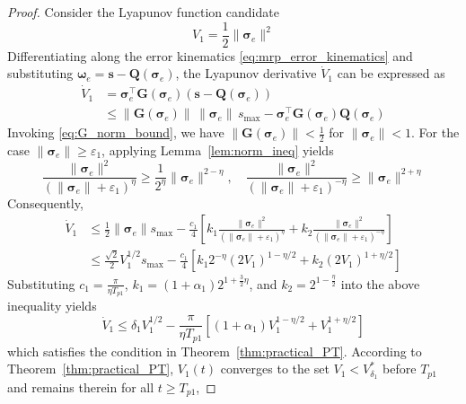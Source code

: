 \documentclass[journal]{new-aiaa}
\begin{document}
\begin{proof}
Consider the Lyapunov function candidate
\begin{equation}
V_1 = \frac{1}{2}\|\boldsymbol{\sigma}_e\|^2
\end{equation}
Differentiating along the error kinematics \eqref{eq:mrp_error_kinematics} and 
substituting $\boldsymbol{\omega}_e = \boldsymbol{s} - \boldsymbol{Q}(\boldsymbol{\sigma}_e)$, 
the Lyapunov derivative $\dot{V}_1$ can be expressed as
\begin{align}
\dot{V}_1 
&= \boldsymbol{\sigma}_e^\top \boldsymbol{G}(\boldsymbol{\sigma}_e)(\boldsymbol{s} - \boldsymbol{Q}(\boldsymbol{\sigma}_e)) \nonumber \\
&\le \|\boldsymbol{G}(\boldsymbol{\sigma}_e)\|\,\|\boldsymbol{\sigma}_e\|\,s_{\max}
- \boldsymbol{\sigma}_e^\top \boldsymbol{G}(\boldsymbol{\sigma}_e) \boldsymbol{Q}(\boldsymbol{\sigma}_e)
\end{align}
Invoking \eqref{eq:G_norm_bound}, we have $\|\boldsymbol{G}(\boldsymbol{\sigma}_e)\| < \tfrac{1}{2}$ for $\|\boldsymbol{\sigma}_e\| < 1$. 
For the case $\|\boldsymbol{\sigma}_e\| \ge \varepsilon_1$, applying Lemma~\ref{lem:norm_ineq} yields
\[
\frac{\|\boldsymbol{\sigma}_e\|^2}{(\|\boldsymbol{\sigma}_e\| + \varepsilon_1)^\eta} \ge \frac{1}{2^\eta} \|\boldsymbol{\sigma}_e\|^{2 - \eta},
\quad
\frac{\|\boldsymbol{\sigma}_e\|^2}{(\|\boldsymbol{\sigma}_e\| + \varepsilon_1)^{-\eta}} \ge \|\boldsymbol{\sigma}_e\|^{2 + \eta}
\]
Consequently,
\begin{align}
\dot{V}_1 
&\le \frac{1}{2} \|\boldsymbol{\sigma}_e\| s_{\max}
- \frac{c_1}{4} \left[
k_1 \frac{\|\boldsymbol{\sigma}_e\|^2}{(\|\boldsymbol{\sigma}_e\| + \varepsilon_1)^\eta}
+ k_2 \frac{\|\boldsymbol{\sigma}_e\|^2}{(\|\boldsymbol{\sigma}_e\| + \varepsilon_1)^{-\eta}}
\right] \nonumber \\
&\le \frac{\sqrt{2}}{2} V_1^{1/2} s_{\max}
- \frac{c_1}{4} \left[
k_1 2^{-\eta} (2 V_1)^{1 - \eta/2}
+ k_2 (2 V_1)^{1 + \eta/2}
\right]
\end{align}
Substituting $c_1 = \frac{\pi}{\eta T_{p1}}$, $k_1 = (1 + \alpha_1) 2^{1 + \frac{3}{2}\eta}$, and $k_2 = 2^{1 - \frac{\eta}{2}}$ into the above inequality yields
\begin{equation}
\dot{V}_1 \le \delta_1 V_1^{1/2} - \frac{\pi}{\eta T_{p1}} \left[ (1 + \alpha_1) V_1^{1 - \eta/2} + V_1^{1 + \eta/2} \right]
\end{equation}
which satisfies the condition in Theorem~\ref{thm:practical_PT}. According to Theorem~\ref{thm:practical_PT}, $V_1(t)$ converges to the set $V_1 < V^*_{\delta_1}$ before $T_{p1}$ and remains therein for all $t \ge T_{p1}$,

\end{proof}
\end{document}

